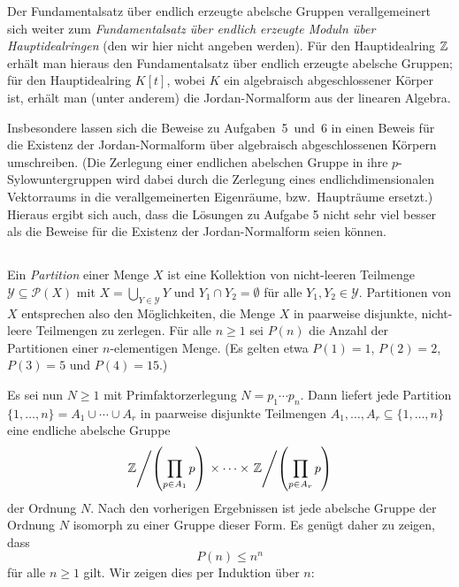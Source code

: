 \begin{remark}
  Der Fundamentalsatz über endlich erzeugte abelsche Gruppen verallgemeinert sich weiter zum \emph{Fundamentalsatz über endlich erzeugte Moduln über Hauptidealringen} (den wir hier nicht angeben werden).
  Für den Hauptidealring $\mathbb{Z}$ erhält man hieraus den Fundamentalsatz über endlich erzeugte abelsche Gruppen;
  für den Hauptidealring $K[t]$, wobei $K$ ein algebraisch abgeschlossener Körper ist, erhält man (unter anderem) die Jordan-Normalform aus der linearen Algebra.
  
  Insbesondere lassen sich die Beweise zu Aufgaben~5~und~6 in einen Beweis für die Existenz der Jordan-Normalform über algebraisch abgeschlossenen Körpern umschreiben.
  (Die Zerlegung einer endlichen abelschen Gruppe in ihre $p$-Sylowuntergruppen wird dabei durch die Zerlegung eines endlichdimensionalen Vektorraums in die verallgemeinerten Eigenräume, bzw.\ Haupträume ersetzt.)
  Hieraus ergibt sich auch, dass die Lösungen zu Aufgabe 5 nicht sehr viel besser als die Beweise für die Existenz der Jordan-Normalform seien können.
\end{remark}





\subsection{}


Ein \emph{Partition} einer Menge $X$ ist eine Kollektion von nicht-leeren Teilmenge $\mathcal{Y} \subseteq \mathcal{P}(X)$ mit $X = \bigcup_{Y \in \mathcal{Y}} Y$ und $Y_1 \cap Y_2 = \emptyset$ für alle $Y_1, Y_2 \in \mathcal{Y}$.
Partitionen von $X$ entsprechen also den Möglichkeiten, die Menge $X$ in paarweise disjunkte, nicht-leere Teilmengen zu zerlegen.
Für alle $n \geq 1$ sei $P(n)$ die Anzahl der Partitionen einer $n$-elementigen Menge.
(Es gelten etwa $P(1) = 1$, $P(2) = 2$, $P(3) = 5$ und $P(4) = 15$.)

Es sei nun $N \geq 1$ mit Primfaktorzerlegung $N = p_1 \dotsm p_n$.
Dann liefert jede Partition $\{1, \dotsc, n\} = A_1 \cup \dotsb \cup A_r$ in paarweise disjunkte Teilmengen $A_1, \dotsc, A_r \subseteq \{1, \dotsc, n\}$ eine endliche abelsche Gruppe
\[
          \left. \mathbb{Z} \middle/ \left( \prod_{p \in A_1} p \right) \right.
  \times  \dotsb
  \times  \left. \mathbb{Z} \middle/ \left( \prod_{p \in A_r} p \right) \right.
\]
der Ordnung $N$.
Nach den vorherigen Ergebnissen ist jede abelsche Gruppe der Ordnung $N$ isomorph zu einer Gruppe dieser Form.
Es genügt daher zu zeigen, dass
\[
  P(n) \leq n^n
\]
für alle $n \geq 1$ gilt.
Wir zeigen dies per Induktion über $n$:

